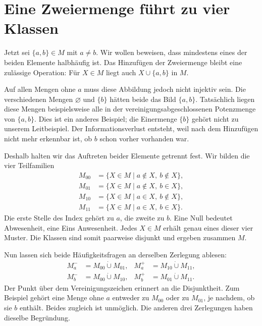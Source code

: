 \par{}
\section*{Eine Zweiermenge führt zu vier Klassen}
\hypertarget{frankl.reading.partition}{}
\hypertarget{frankl.reading.classes}{}

Jetzt sei \(\{a,b\}\in M\) mit \(a\neq b\). Wir wollen
beweisen, dass mindestens eines der beiden Elemente
halbhäufig ist. Das Hinzufügen der Zweiermenge bleibt eine
zulässige Operation: Für \(X\in M\) liegt auch
\(X\cup\{a,b\}\) in \(M\).

Auf allen Mengen ohne \(a\) muss diese Abbildung jedoch
nicht injektiv sein. Die verschiedenen Mengen
\(\varnothing\) und \(\{b\}\) hätten beide das Bild
\(\{a,b\}\). Tatsächlich liegen diese Mengen beispielsweise
alle in der vereinigungsabgeschlossenen Potenzmenge von
\(\{a,b\}\). Dies ist ein anderes Beispiel; die Einermenge
\(\{b\}\) gehört nicht zu unserem Leitbeispiel.
Der Informationsverlust entsteht, weil nach dem Hinzufügen
nicht mehr erkennbar ist, ob \(b\) schon vorher vorhanden war.

Deshalb halten wir das Auftreten beider Elemente getrennt
fest. Wir bilden die vier Teilfamilien
\[
  \begin{aligned}
    M_{00}&=\{X\in M\mid a\notin X,\ b\notin X\},\\
    M_{01}&=\{X\in M\mid a\notin X,\ b\in X\},\\
    M_{10}&=\{X\in M\mid a\in X,\ b\notin X\},\\
    M_{11}&=\{X\in M\mid a\in X,\ b\in X\}.
  \end{aligned}
\]
Die erste Stelle des Index gehört zu \(a\), die zweite
zu \(b\). Eine Null bedeutet Abwesenheit, eine Eins
Anwesenheit. Jedes \(X\in M\) erhält genau eines dieser
vier Muster. Die Klassen sind somit paarweise disjunkt
und ergeben zusammen \(M\).

\FranklFourClassTable

Nun lassen sich beide Häufigkeitsfragen an derselben
Zerlegung ablesen:
\begin{equation}
  \begin{aligned}
    M_a^-&=M_{00}\mathbin{\dot\cup}M_{01},
    &M_a^+&=M_{10}\mathbin{\dot\cup}M_{11},\\
    M_b^-&=M_{00}\mathbin{\dot\cup}M_{10},
    &M_b^+&=M_{01}\mathbin{\dot\cup}M_{11}.
  \end{aligned}
  \tag{Z}\label{frankl-reading-partition}
\end{equation}
Der Punkt über dem Vereinigungszeichen erinnert an die
Disjunktheit. Zum Beispiel gehört eine Menge ohne \(a\)
entweder zu \(M_{00}\) oder zu \(M_{01}\), je nachdem,
ob sie \(b\) enthält. Beides zugleich ist unmöglich.
Die anderen drei Zerlegungen haben dieselbe Begründung.

